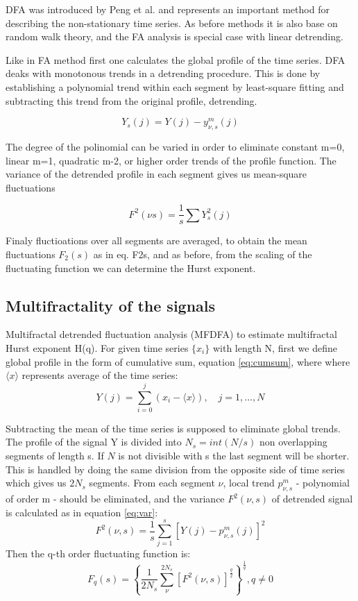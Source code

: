 DFA was introduced by Peng et al. and represents an important method for describing the non-stationary time series. As before methods it is also base on random walk theory, and the FA analysis is special case with linear detrending. 

Like in FA method first one calculates the global profile of the time series. DFA deaks with monotonous trends in a detrending procedure. This is done by establishing a polynomial trend within each segment by least-square fitting and subtracting this trend from the original profile, detrending. 

$$Y_s(j) = Y(j) - y_{\nu ,s}^{m}(j)$$

The degree of the polinomial can be varied in order to eliminate constant m=0, linear m=1, quadratic m-2, or higher order trends of the profile function. The variance of the detrended profile in each segment gives us mean-square fluctuations

$$F^2(\nu  s) = \frac{1}{s} \sum Y_s^2(j)$$

Finaly fluctioations over all segments are averaged, to obtain the mean fluctuations $F_2(s)$ as in eq. F2s, and as before, from the scaling of the fluctuating function we can determine the Hurst exponent. 

\subsection{Multifractality of the signals}

Multifractal detrended fluctuation analysis (MFDFA) \cite{kantelhardt2002, ihlen2012} to estimate multifractal Hurst exponent H(q). For given time series $\{x_i\}$ with length N, first we define global profile in the form of cumulative sum, equation \ref{eq:cumsum}, where where $\langle x\rangle $ represents average of the time series:
\begin{equation}
Y(j) = \sum_{i=0} ^j (x_i - \langle x\rangle), \quad j=1, ..., N
\label{eq:cumsum}
\end{equation}

Subtracting the mean of the time series is supposed to eliminate global trends. The profile of the signal Y is divided into $N_s = int (N/s)$ non overlapping segments of length s. If $N$ is not divisible with s the last segment will be shorter. This is handled by doing the same division from the opposite side of time series which gives us $2N_s$ segments. From each segment $\nu$, local trend $p^m_{\nu, s}$ - polynomial of order m - should be eliminated, and the variance $F^2(\nu, s)$ of detrended signal is calculated as in equation \ref{eq:var}:
\begin{equation}
F^2(\nu, s) = \frac{1}{s}\sum_{j=1}^s \left[Y(j) - p^m_{\nu, s}(j)\right]^2
\label{eq:var}
\end{equation}
Then the q-th order fluctuating function is: 
\begin{equation}
F_q(s) = \left\{\frac{1}{2N_s}\sum_{\nu}^{2N_s}\left[F^2(\nu, s)\right]^{\frac{q}{2}}\right\}^{\frac{1}{q}},  q \neq 0 \nonumber
\end{equation}

